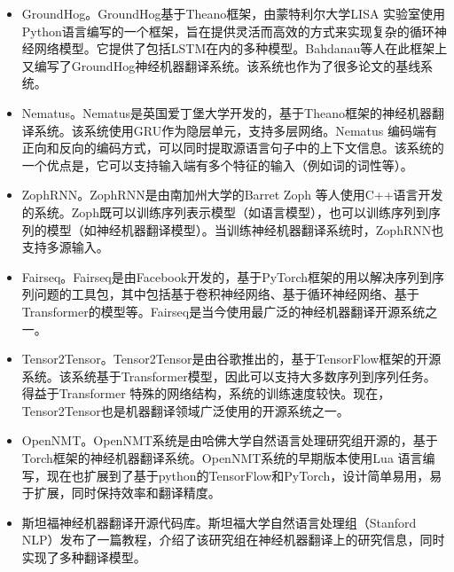 \begin{appendices}
\begin{itemize}
\vspace{0.5em}
\item GroundHog。GroundHog基于Theano框架，由蒙特利尔大学LISA 实验室使用Python语言编写的一个框架，旨在提供灵活而高效的方式来实现复杂的循环神经网络模型。它提供了包括LSTM在内的多种模型。Bahdanau等人在此框架上又编写了GroundHog神经机器翻译系统。该系统也作为了很多论文的基线系统。
\vspace{0.5em}
\item Nematus。Nematus是英国爱丁堡大学开发的，基于Theano框架的神经机器翻译系统。该系统使用GRU作为隐层单元，支持多层网络。Nematus 编码端有正向和反向的编码方式，可以同时提取源语言句子中的上下文信息。该系统的一个优点是，它可以支持输入端有多个特征的输入（例如词的词性等）。
\vspace{0.5em}
\item ZophRNN。ZophRNN是由南加州大学的Barret Zoph 等人使用C++语言开发的系统。Zoph既可以训练序列表示模型（如语言模型），也可以训练序列到序列的模型（如神经机器翻译模型）。当训练神经机器翻译系统时，ZophRNN也支持多源输入。
\vspace{0.5em}
\item Fairseq。Fairseq是由Facebook开发的，基于PyTorch框架的用以解决序列到序列问题的工具包，其中包括基于卷积神经网络、基于循环神经网络、基于Transformer的模型等。Fairseq是当今使用最广泛的神经机器翻译开源系统之一。
\vspace{0.5em}
\item Tensor2Tensor。Tensor2Tensor是由谷歌推出的，基于TensorFlow框架的开源系统。该系统基于Transformer模型，因此可以支持大多数序列到序列任务。得益于Transformer 特殊的网络结构，系统的训练速度较快。现在，Tensor2Tensor也是机器翻译领域广泛使用的开源系统之一。
\vspace{0.5em}
\item OpenNMT。OpenNMT系统是由哈佛大学自然语言处理研究组开源的，基于Torch框架的神经机器翻译系统。OpenNMT系统的早期版本使用Lua 语言编写，现在也扩展到了基于python的TensorFlow和PyTorch，设计简单易用，易于扩展，同时保持效率和翻译精度。
\vspace{0.5em}
\item 斯坦福神经机器翻译开源代码库。斯坦福大学自然语言处理组（Stanford NLP）发布了一篇教程，介绍了该研究组在神经机器翻译上的研究信息，同时实现了多种翻译模型。 
\vspace{0.5em}

\end{itemize}
\end{appendices}
